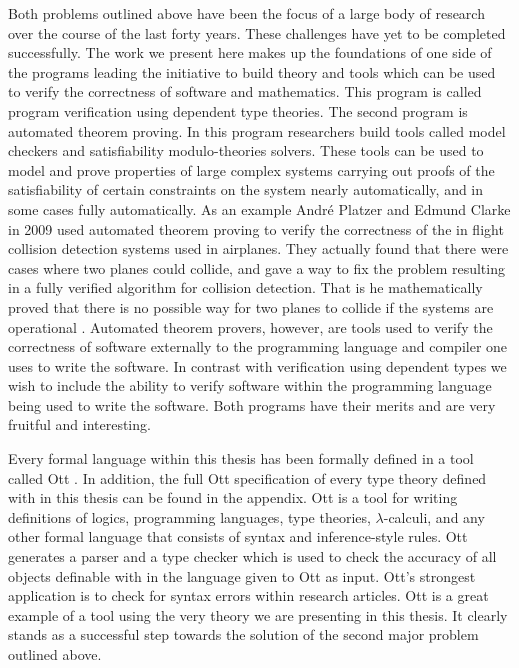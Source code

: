 \documentclass[phd,appendix,dedicationpage,ackpage,epigraphpage]{uithesis}
\begin{document}
Both problems outlined above have been the focus of a large body of
research over the course of the last forty years.  These challenges
have yet to be completed successfully.  The work we present here makes
up the foundations of one side of the programs leading the initiative
to build theory and tools which can be used to verify the correctness
of software and mathematics.  This program is called program
verification using dependent type theories.  The second program is
automated theorem proving.  In this program researchers build tools
called model checkers and satisfiability modulo-theories solvers.
These tools can be used to model and prove properties of large complex
systems carrying out proofs of the satisfiability of certain
constraints on the system nearly automatically, and in some cases
fully automatically.  As an example Andr\'{e} Platzer and Edmund
Clarke in 2009 used automated theorem proving to verify the
correctness of the in flight collision detection systems used in
airplanes.  They actually found that there were cases where two planes
could collide, and gave a way to fix the problem resulting in a fully
verified algorithm for collision detection.  That is he mathematically
proved that there is no possible way for two planes to collide if the
systems are operational \cite{DBLP:conf/fm/PlatzerC09}.  Automated
theorem provers, however, are tools used to verify the correctness of
software externally to the programming language and compiler one uses
to write the software.  In contrast with verification using dependent
types we wish to include the ability to verify software within the
programming language being used to write the software. Both programs
have their merits and are very fruitful and interesting.

Every formal language within this thesis has been formally defined in
a tool called Ott \cite{Sewell:2010}.  In addition, the full Ott
specification of every type theory defined with in this thesis can be
found in the appendix.  Ott is a tool for writing definitions of
logics, programming languages, type theories, $\lambda$-calculi, and
any other formal language that consists of syntax and inference-style
rules.  Ott generates a parser and a type checker which is used to
check the accuracy of all objects definable with in the language given
to Ott as input.  Ott's strongest application is to check for syntax
errors within research articles.  Ott is a great example of a tool
using the very theory we are presenting in this thesis.  It clearly
stands as a successful step towards the solution of the second major
problem outlined above.
\end{document}
